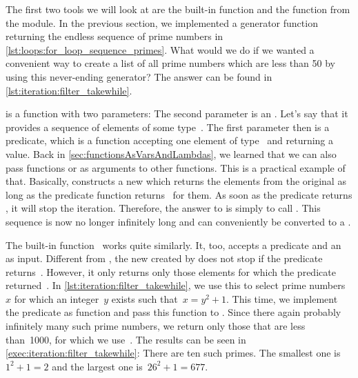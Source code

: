 The first two tools we will look at are the built-in function  and the  function from the  module.
In the previous section, we implemented a generator function returning the endless sequence of prime numbers in \cref{lst:loops:for_loop_sequence_primes}.
What would we do if we wanted a convenient way to create a list of all prime numbers which are less than 50 by using this never-ending generator?
The answer can be found in \cref{lst:iteration:filter_takewhile}.

 is a function with two parameters:
The second parameter is an .
Let's say that it provides a sequence of elements of some type~.
The first parameter then is a predicate, which is a function accepting one element of type~ and returning a  value.
Back in \cref{sec:functionsAsVarsAndLambdas}, we learned that we can also pass functions or  as arguments to other functions.
This is a practical example of that.
Basically,  constructs a new  which returns the elements from the original  as long as the predicate function returns~ for them.
As soon as the predicate returns , it will stop the iteration.
Therefore, the answer to  is simply to call .
This sequence is now no longer infinitely long and can conveniently be converted to a .

The built-in function~ works quite similarly.
It, too, accepts a predicate and an~ as input.
Different from , the new  created by  does not stop if the predicate returns~.
However, it only returns only those elements for which the predicate returned~.
In \cref{lst:iteration:filter_takewhile}, we use this to select prime numbers~$x$ for which an integer~$y$ exists such that~$x=y^2+1$.
This time, we implement the predicate as function  and pass this function to .
Since there again probably infinitely many such prime numbers, we return only those that are less than~1000, for which we use~.
The results can be seen in \cref{exec:iteration:filter_takewhile}:
There are ten such primes.
The smallest one is $1^2+1=2$ and the largest one is~$26^2+1=677$.

